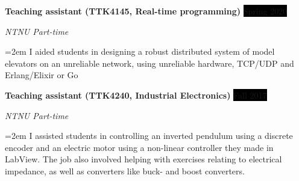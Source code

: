 \documentclass[paper=a4,fontsize=11pt,norsk]{scrartcl} %
\newcommand{\EducationEntry}[4]{
		\noindent \textbf{#1} \hfill      %
		\colorbox{Black}{%
			\parbox{6em}{%
			\hfill\color{White}#2}} \par  %
		\noindent \textit{#3} \par        %
		\noindent\hangindent=2em\hangafter=0 \small #4 %
		\normalsize \par}
\newcommand{\WorkEntry}[4]{				  %
		\noindent \textbf{#1} \hfill      %
		\colorbox{Black}{\color{White}#2} \par  %
		\noindent \textit{#3} \par              %
		\noindent\hangindent=2em\hangafter=0 \small #4 %
		\normalsize \par}
\begin{document}




 

\WorkEntry{Teaching assistant (TTK4145, Real-time programming)}{Spring 2020}{NTNU Part-time}
{I aided students in designing a robust distributed system of model elevators on an unreliable network, using unreliable hardware, TCP/UDP and Erlang/Elixir or Go}



\WorkEntry{Teaching assistant (TTK4240, Industrial Electronics)}{Fall 2017}{NTNU Part-time}
{I assisted students in controlling an inverted pendulum using a discrete encoder and an electric motor using a non-linear controller they made in LabView. The job also involved helping with exercises relating to electrical impedance, as well as converters like buck- and boost converters. 
}
\end{document}
